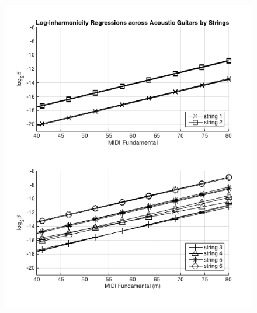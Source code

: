 \documentclass[12pt]{cmuthesis}
\begin{document}
\begin{figure}[!htbp] 
\label{fig:traj-compare-ag}
\centering
\includegraphics[scale=0.75]{traj-compare-ag}
\caption{}
\end{figure}
\end{document}
